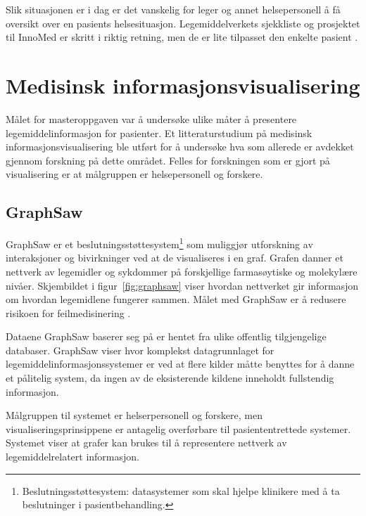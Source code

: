 Slik situasjonen er i dag er det vanskelig for leger og annet helsepersonell å få oversikt over en pasients helsesituasjon. Legemiddelverkets sjekkliste og prosjektet til InnoMed er skritt i riktig retning, men de er lite tilpasset den enkelte pasient \citep{legemiddelgjennomgangTiltak}. 


\section{Medisinsk informasjonsvisualisering}
Målet for masteroppgaven var å undersøke ulike måter å presentere legemiddelinformasjon for pasienter. Et litteraturstudium på medisinsk informasjonsvisualisering ble utført for å undersøke hva som allerede er avdekket gjennom forskning på dette området. Felles for forskningen som er gjort på visualisering er at målgruppen er helsepersonell og forskere.

\subsection{GraphSaw} 
GraphSaw er et beslutningsstøttesystem\footnote{Beslutningsstøttesystem: datasystemer som skal hjelpe klinikere med å ta beslutninger i pasientbehandling.} som muliggjør utforskning av interaksjoner og bivirkninger ved at de visualiseres i en graf. Grafen danner et nettverk av legemidler og sykdommer på forskjellige farmasøytiske og molekylære nivåer. Skjembildet i figur~\ref{fig:graphsaw} viser hvordan nettverket gir informasjon om hvordan legemidlene fungerer sammen. Målet med GraphSaw er å redusere risikoen for feilmedisinering \citep{shoshi2015graphsaw}.  

Dataene GraphSaw baserer seg på er hentet fra ulike offentlig tilgjengelige databaser. GraphSaw viser hvor komplekst datagrunnlaget for legemiddelinformasjonssystemer er ved at flere kilder måtte benyttes for å danne et pålitelig system, da ingen av de eksisterende kildene inneholdt fullstendig informasjon. 

Målgruppen til systemet er helserpersonell og forskere, men visualiseringsprinsippene er antagelig overførbare til pasiententrettede systemer. Systemet viser at grafer kan brukes til å representere nettverk av legemiddelrelatert informasjon.

